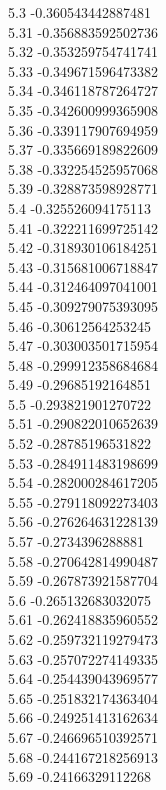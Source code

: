 {5.3	-0.360543442887481\\
5.31	-0.356883592502736\\
5.32	-0.353259754741741\\
5.33	-0.349671596473382\\
5.34	-0.346118787264727\\
5.35	-0.342600999365908\\
5.36	-0.339117907694959\\
5.37	-0.335669189822609\\
5.38	-0.332254525957068\\
5.39	-0.328873598928771\\
5.4	-0.325526094175113\\
5.41	-0.322211699725142\\
5.42	-0.318930106184251\\
5.43	-0.315681006718847\\
5.44	-0.312464097041001\\
5.45	-0.309279075393095\\
5.46	-0.30612564253245\\
5.47	-0.303003501715954\\
5.48	-0.299912358684684\\
5.49	-0.29685192164851\\
5.5	-0.293821901270722\\
5.51	-0.290822010652639\\
5.52	-0.28785196531822\\
5.53	-0.284911483198699\\
5.54	-0.282000284617205\\
5.55	-0.279118092273403\\
5.56	-0.276264631228139\\
5.57	-0.2734396288881\\
5.58	-0.270642814990487\\
5.59	-0.267873921587704\\
5.6	-0.265132683032075\\
5.61	-0.262418835960552\\
5.62	-0.259732119279473\\
5.63	-0.257072274149335\\
5.64	-0.254439043969577\\
5.65	-0.251832174363404\\
5.66	-0.249251413162634\\
5.67	-0.246696510392571\\
5.68	-0.244167218256913\\
5.69	-0.24166329112268\\
}
